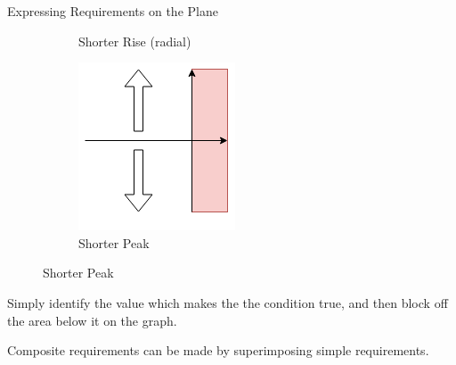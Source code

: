 \documentclass{../templates/topic}
\begin{document}
\begin{section}{Expressing Requirements on the Plane}
\begin{figure}
\begin{subfigure}[b]{0.4\textwidth}
		\caption{Shorter Rise (radial)}
		\end{subfigure}
		\begin{subfigure}[b]{0.4\textwidth}
		\includegraphics[width=\textwidth]{complex_plane_peak.png}
		\caption{Shorter Peak}
		\end{subfigure}

	\end{figure}
	
	Simply identify the value which makes the the condition true, and then block off the area below it on the graph.
	
	Composite requirements can be made by superimposing simple requirements.

\end{section}
\end{document}
